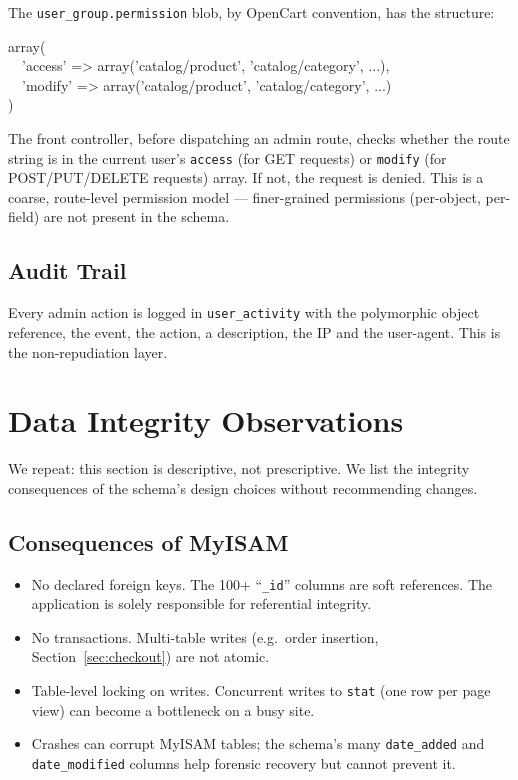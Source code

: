 \documentclass[11pt,a4paper]{article}
\begin{document}
The \texttt{user\_group.permission} blob, by OpenCart
convention, has the structure:

\begin{tcolorbox}[enhanced,colback=nodefillgray,colframe=black!40,boxrule=0.3pt,arc=2pt,left=8pt,right=8pt,top=4pt,bottom=4pt,fontupper=\small\ttfamily]
array(\\
\ \ 'access' => array('catalog/product', 'catalog/category', ...),\\
\ \ 'modify' => array('catalog/product', 'catalog/category', ...)\\
)
\end{tcolorbox}

The front controller, before dispatching an admin route,
checks whether the route string is in the current user's
\texttt{access} (for GET requests) or \texttt{modify} (for
POST/PUT/DELETE requests) array. If not, the request is
denied. This is a coarse, route-level permission model ---
finer-grained permissions (per-object, per-field) are not
present in the schema.

\subsection{Audit Trail}

Every admin action is logged in \texttt{user\_activity} with
the polymorphic object reference, the event, the action, a
description, the IP and the user-agent. This is the
non-repudiation layer.

\section{Data Integrity Observations}\label{sec:integrity}

We repeat: this section is descriptive, not prescriptive. We
list the integrity consequences of the schema's design choices
without recommending changes.

\subsection{Consequences of MyISAM}

\begin{itemize}[leftmargin=1.6em,itemsep=2pt]
  \item No declared foreign keys. The 100+ ``\texttt{\_id}''
        columns are soft references. The application is solely
        responsible for referential integrity.
  \item No transactions. Multi-table writes (e.g.\ order
        insertion, Section~\ref{sec:checkout}) are not atomic.
  \item Table-level locking on writes. Concurrent writes to
        \texttt{stat} (one row per page view) can become a
        bottleneck on a busy site.
  \item Crashes can corrupt MyISAM tables; the schema's many
        \texttt{date\_added} and \texttt{date\_modified}
        columns help forensic recovery but cannot prevent it.
\end{itemize}
\end{document}
